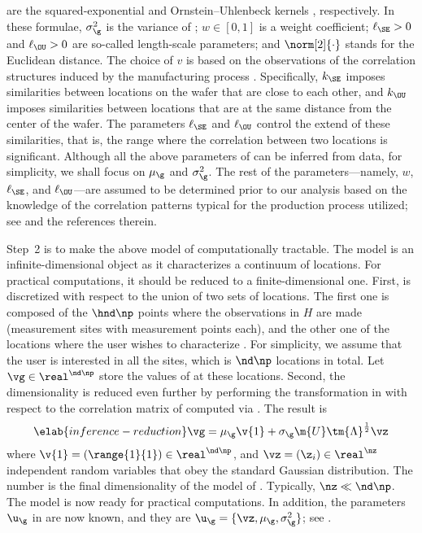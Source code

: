 are the squared-exponential and Ornstein--Uhlenbeck kernels
\cite{rasmussen2006}, respectively. In these formulae, $\sigma_\g^2$ is the
variance of \g; $w \in [0, 1]$ is a weight coefficient; $\ell_\SE > 0$ and
$\ell_\OU > 0$ are so-called length-scale parameters; and $\norm[2]{\cdot}$
stands for the Euclidean distance. The choice of $v$ is based on the
observations of the correlation structures induced by the manufacturing process
\cite{chandrakasan2000, cheng2011}. Specifically, $k_\SE$ imposes similarities
between locations on the wafer that are close to each other, and $k_\OU$
imposes similarities between locations that are at the same distance from the
center of the wafer. The parameters $\ell_\SE$ and $\ell_\OU$ control the
extend of these similarities, that is, the range where the correlation between
two locations is significant. Although all the above parameters of \g can be
inferred from data, for simplicity, we shall focus on $\mu_\g$ and
$\sigma_\g^2$. The rest of the parameters---namely, $w$, $\ell_\SE$, and
$\ell_\OU$---are assumed to be determined prior to our analysis based on the
knowledge of the correlation patterns typical for the production process
utilized; see \cite{marzouk2009} and the references therein.

Step~2 is to make the above model of \g computationally tractable. The model is
an infinite-dimensional object as it characterizes a continuum of locations. For
practical computations, it should be reduced to a finite-dimensional one. First,
\g is discretized with respect to the union of two sets of locations. The first
one is composed of the $\hnd \np$ points where the observations in $H$ are made
(\hnd measurement sites with \np measurement points each), and the other one of
the locations where the user wishes to characterize \g. For simplicity, we
assume that the user is interested in all the sites, which is $\nd \np$
locations in total. Let $\vg \in \real^{\nd \np}$ store the values of \g at
these locations. Second, the dimensionality is reduced even further by
performing the transformation in  with respect to
the correlation matrix of \vg computed via . The
result is
\begin{equation} \elab{inference-reduction}
  \vg = \mu_\g \v{1} + \sigma_\g \m{U} \tm{\Lambda}^\frac{1}{2} \vz
\end{equation}
where $\v{1} = (\range{1}{1}) \in \real^{\nd \np}$, and $\vz = (\z_i) \in
\real^\nz$ independent random variables that obey the standard Gaussian
distribution. The number \nz is the final dimensionality of the model of \g.
Typically, $\nz \ll \nd \np$. The model is now ready for practical computations.
In addition, the parameters $\u_\g$ in  are now known, and
they are $\u_\g = \{ \vz, \mu_\g, \sigma^2_\g \}$; see
.

